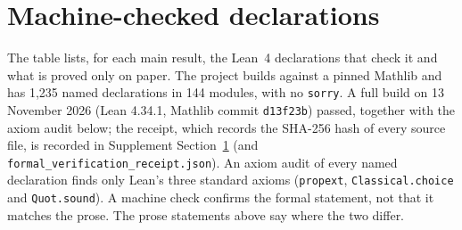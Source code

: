 \documentclass[12pt]{article}
\theoremstyle{definition}
\theoremstyle{remark}
\begin{document}
\section{Machine-checked declarations}\label{app:verification}

The table lists, for each main result, the Lean~4 declarations that check it and what is proved only on paper. The project builds against a pinned Mathlib and has 1,235 named declarations in 144 modules, with no \texttt{sorry}. A full build on 13 November 2026 (Lean 4.34.1, Mathlib commit \texttt{d13f23b}) passed, together with the axiom audit below; the receipt, which records the SHA-256 hash of every source file, is recorded in Supplement Section~\ref{app:verification} (and \nolinkurl{formal_verification_receipt.json}). An axiom audit of every named declaration finds only Lean's three standard axioms (\texttt{propext}, \texttt{Classical.choice} and \texttt{Quot.sound}). A machine check confirms the formal statement, not that it matches the prose. The prose statements above say where the two differ.
\end{document}
